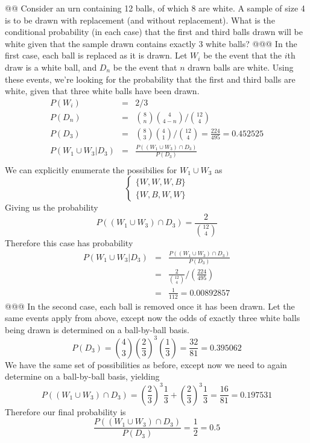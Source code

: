 \documentclass[10pt]{article}
\begin{document}
\begin{easylist}[enumerate]
    @@ Consider an urn containing 12 balls, of which 8 are white. A sample of size 4 is to be drawn with replacement
    (and without replacement). What is the conditional probability (in each case) that the first and third balls drawn
    will be white given that the sample drawn contains exactly 3 white balls?
    @@@ In the first case, each ball is replaced as it is drawn. Let $W_i$ be the event that the $i$th draw is a white
    ball, and $D_n$ be the event that $n$ drawn balls are white. Using these events, we're looking for the probability
    that the first and third balls are white, given that three white balls have been drawn.
        \[
            \begin{aligned}
                P(W_i) &=& 2/3\\
                P(D_n) &=& \binom{8}{n} \binom{4}{4 - n} \Big / \binom{12}{4}\\
                P(D_3) &=& \binom{8}{3} \binom{4}{1} \Big / \binom{12}{4} = \frac{224}{495} = 0.452525\\
                P(W_1 \cup W_3|D_3) &=& \frac{P((W_1 \cup W_3) \cap D_3)}{P(D_3)}\\
            \end{aligned}
        \]
    We can explicitly enumerate the possibilies for $W_1 \cup W_3$ as
        \[
            \begin{cases}
                \{ W, W, W, B \}\\
                \{ W, B, W, W \}
            \end{cases}
        \]
    Giving us the probability
        \[ P((W_1 \cup W_3) \cap D_3) = \frac{2}{\binom{12}{4}} \]
    Therefore this case has probability
        \[
            \begin{aligned}
                P(W_1 \cup W_3|D_3) &=& \frac{P((W_1 \cup W_3) \cap D_3)}{P(D_3)}\\
                                    &=& \frac{2}{\binom{12}{4}} \Big / \left( \frac{224}{495} \right)\\
                                    &=& \frac{1}{112} = \boxed{0.00892857}
            \end{aligned}
        \]
    @@@ In the second case, each ball is removed once it has been drawn. Let the same events apply from above, except
    now the odds of exactly three white balls being drawn is determined on a ball-by-ball basis.
        \[ P(D_3) = \binom{4}{3} {\left( \frac{2}{3} \right)}^3 \left( \frac{1}{3} \right) = \frac{32}{81} = 0.395062 \]
    We have the same set of possibilities as before, except now we need to again determine on a ball-by-ball basis,
    yielding
        \[ P((W_1 \cup W_3) \cap D_3) = {\left( \frac{2}{3} \right)}^3 \frac{1}{3} + {\left( \frac{2}{3} \right)}^3
        \frac{1}{3} = \frac{16}{81} = 0.197531 \]
    Therefore our final probability is
        \[ \frac{P((W_1 \cup W_3) \cap D_3)}{P(D_3)} = \frac{1}{2} = \boxed{0.5} \]


\end{easylist}
\end{document}
